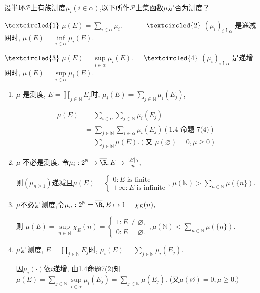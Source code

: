\begin{7}
设半环$\mathcal{P}$上有族测度$\mu_i(i\in\alpha)$,以下所作$\mathcal{P}$上集函数$\mu$是否为测度？

$\textcircled{1}$ $\mu ( E) = \sum\limits_{i\in \alpha }\mu_{i}.
\quad\qquad$  $\textcircled{2}$ $( \mu _{i})_{i\uparrow \alpha }$ 是递减网时, $\mu(E)=\inf\limits_{i\in\alpha}\mu_{i}(E).$

$\textcircled{3}$ $\mu(E)=\sup\limits_{i\in\alpha}\mu_i(E).
\quad$ $\textcircled{4}$ $\left(\mu_i\right)_{i\uparrow\alpha}$ 是递增网时, $\mu(E)=\sup\limits_{i\in\alpha}\mu_i(E).$
\end{7}  
\begin{solution}
\begin{enumerate}
\item[$\textcircled{1}$] $\mu$ 是测度, $E=\coprod\limits_{j\in\mathbb{N}}E_{j}$时, 
$\mu_{i}(E)=\sum\limits_{j\in\mathbb{N}}\mu_{i}(E_j)$,

\begin{align*}
    \mu(E)&=\sum_{i\in\alpha}\sum_{j\in \mathbb{N}}\mu_{i}(E_{j})\\
    &=\sum_{j\in \mathbb{N}}\sum_{i\in \alpha}\mu_{i}(E_j)\left(\text{1.4 命题 7(4)}\right)\\
    &=\sum_{j\in \mathbb{N}}\mu({E}).\left(\text{又 }\mu(\varnothing)=0,\mu\geq0\right)  
\end{align*}

\item[$\textcircled{2}$] $\mu$ 不必是测度. 令$\mu_{i}:2^{\mathbb{N}}\to\overline{\R},E\mapsto \frac{|E|_{0}}{n},$

则$(\mu_{n\geqslant1})$递减且$\mu(E)=\begin{cases}0:E\text{ is finite}\\+\infty :E\text{ is infinite}\end{cases}$,
$\mu(\mathbb{N})>\sum\limits_{n\in \mathbb{N}}\mu(\{n\})$.

\item[$\textcircled{3}$] $\mu $不必是测度,令$\mu_{n}:2^{\mathbb{N}}=\overline{\R},E\mapsto1-\chi_{E}(n),$

则 $\mu(E)=\sup\limits_{n\in\mathbb{N}}\chi_{E}(n)=\begin{cases}1:E\neq\varnothing,\\0:E=\varnothing.\end{cases},\mu(\mathbb{N})<\sum\limits_{n\in\mathbb{N}}\mu(\{n\})$.

\item[$\textcircled{4}$] $\mu $是测度, $E=\coprod\limits_{j\in \mathbb{N}}E_j$时, $\mu_{i}(E)=\sum\limits_{j\in\mathbb{N}}\mu_{i}(E_j)$.

因$\mu_{i}(\cdot)$依$i$递增, 由1.4命题7(2)知$\mu(E)=\sum\limits_{j\in\mathbb{N}}\sup\limits_{i\in\alpha}\mu_{i}(E_{j})=\sum\limits_{j\in\mathbb{N}}\mu(E_{j})$. (又$\mu(\varnothing)=0,\mu\geqslant0.)$
\end{enumerate}
\end{solution}


